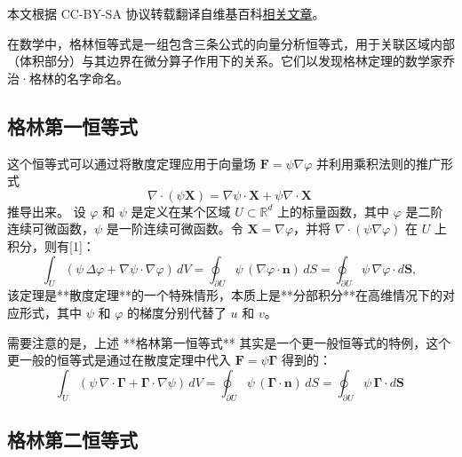 
本文根据 CC-BY-SA 协议转载翻译自维基百科\href{https://en.wikipedia.org/wiki/Green\%27s_identities}{相关文章}。

在数学中，格林恒等式是一组包含三条公式的向量分析恒等式，用于关联区域内部（体积部分）与其边界在微分算子作用下的关系。它们以发现格林定理的数学家乔治·格林的名字命名。
\subsection{格林第一恒等式}
这个恒等式可以通过将散度定理应用于向量场 $\mathbf{F} = \psi \nabla \varphi$ 并利用乘积法则的推广形式
$$
\nabla \cdot (\psi \mathbf{X}) = \nabla \psi \cdot \mathbf{X} + \psi \nabla \cdot \mathbf{X}~
$$
推导出来。
设 $\varphi$ 和 $\psi$ 是定义在某个区域 $U \subset \mathbb{R}^d$ 上的标量函数，其中 $\varphi$ 是二阶连续可微函数，$\psi$ 是一阶连续可微函数。令 $\mathbf{X} = \nabla \varphi$，并将 $\nabla \cdot (\psi \nabla \varphi)$ 在 $U$ 上积分，则有[1]：
$$
\int_U \left(\psi \,\Delta \varphi + \nabla \psi \cdot \nabla \varphi \right) \, dV
= 
\oint_{\partial U} \psi \, (\nabla \varphi \cdot \mathbf{n}) \, dS
=
\oint_{\partial U} \psi \, \nabla \varphi \cdot d\mathbf{S},~
$$
该定理是**散度定理**的一个特殊情形，本质上是**分部积分**在高维情况下的对应形式，其中 $\psi$ 和 $\varphi$ 的梯度分别代替了 $u$ 和 $v$。

需要注意的是，上述 **格林第一恒等式** 其实是一个更一般恒等式的特例，这个更一般的恒等式是通过在散度定理中代入 $\mathbf{F} = \psi \mathbf{\Gamma}$ 得到的：
$$
\int_U \left(\psi \, \nabla \cdot \mathbf{\Gamma} + \mathbf{\Gamma} \cdot \nabla \psi \right)\, dV
=
\oint_{\partial U} \psi \, (\mathbf{\Gamma} \cdot \mathbf{n}) \, dS
=
\oint_{\partial U} \psi \, \mathbf{\Gamma} \cdot d\mathbf{S}~
$$
\subsection{格林第二恒等式}
